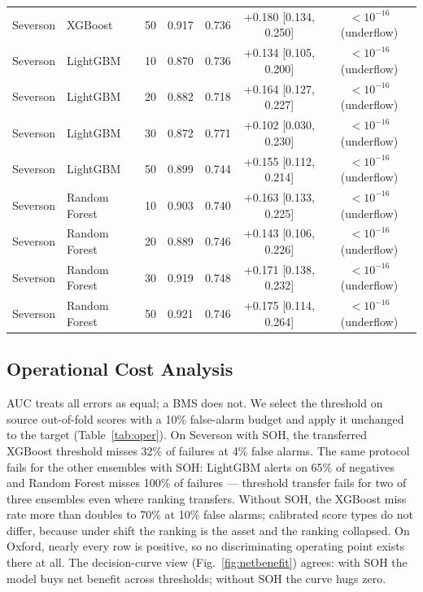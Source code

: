 \documentclass[preprint,12pt]{elsarticle}
\begin{document}
\begin{table}[!t]
{\begin{tabular}{llccccc}
Severson & XGBoost & 50 & 0.917 & 0.736 & +0.180 [0.134, 0.250] & $<10^{-16}$ (underflow) \\
Severson & LightGBM & 10 & 0.870 & 0.736 & +0.134 [0.105, 0.200] & $<10^{-16}$ (underflow) \\
Severson & LightGBM & 20 & 0.882 & 0.718 & +0.164 [0.127, 0.227] & $<10^{-16}$ (underflow) \\
Severson & LightGBM & 30 & 0.872 & 0.771 & +0.102 [0.030, 0.230] & $<10^{-16}$ (underflow) \\
Severson & LightGBM & 50 & 0.899 & 0.744 & +0.155 [0.112, 0.214] & $<10^{-16}$ (underflow) \\
Severson & Random Forest & 10 & 0.903 & 0.740 & +0.163 [0.133, 0.225] & $<10^{-16}$ (underflow) \\
Severson & Random Forest & 20 & 0.889 & 0.746 & +0.143 [0.106, 0.226] & $<10^{-16}$ (underflow) \\
Severson & Random Forest & 30 & 0.919 & 0.748 & +0.171 [0.138, 0.232] & $<10^{-16}$ (underflow) \\
Severson & Random Forest & 50 & 0.921 & 0.746 & +0.175 [0.114, 0.264] & $<10^{-16}$ (underflow) \\
\bottomrule
\end{tabular}}
\end{table}

\subsection{Operational Cost Analysis}
AUC treats all errors as equal; a BMS does not. We select the threshold on source out-of-fold scores with a 10\% false-alarm budget and apply it unchanged to the target (Table~\ref{tab:oper}). On Severson with SOH, the transferred XGBoost threshold misses 32\% of failures at 4\% false alarms. The same protocol fails for the other ensembles with SOH: LightGBM alerts on 65\% of negatives and Random Forest misses 100\% of failures --- threshold transfer fails for two of three ensembles even where ranking transfers. Without SOH, the XGBoost miss rate more than doubles to 70\% at 10\% false alarms; calibrated score types do not differ, because under shift the ranking is the asset and the ranking collapsed. On Oxford, nearly every row is positive, so no discriminating operating point exists there at all. The decision-curve view (Fig.~\ref{fig:netbenefit}) agrees: with SOH the model buys net benefit across thresholds; without SOH the curve hugs zero.
\end{document}
